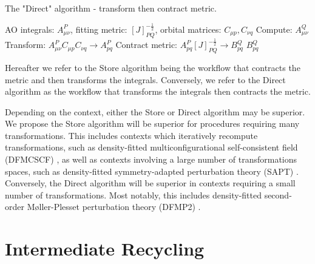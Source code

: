 \begin{algorithm}[H]
\caption{The "Direct" algorithm - transform then contract metric.}
\begin{algorithmic}
\REQUIRE AO integrals: $A_{\mu \nu}^P$, fitting metric: $[J]_{PQ}^{-\frac{1}{2}}$, orbital matrices: $C_{\mu p}, C_{\nu q}$
\STATE Compute: $A_{\mu \nu}^Q$
    \STATE Transform: $A_{\mu \nu}^PC_{\mu p}C_{\nu q} \rightarrow A_{p q}^P$
    \STATE Contract metric: $A_{p q}^P [J]_{PQ}^{-\frac{1}{2}} \rightarrow B_{p q}^Q$
\ENDFOR
\RETURN $B_{p q}^Q$
\end{algorithmic}
\end{algorithm}

\noindent Hereafter we refer to the Store algorithm being the workflow that contracts the metric and then transforms the integrals. Conversely, 
we refer to the Direct algorithm as the workflow that transforms the integrals then contracts the metric. 

Depending on the context, either the Store or Direct algorithm may be superior. We propose the Store algorithm 
will be superior for procedures requiring
many transformations. This includes contexts which iteratively recompute transformations, such as density-fitted 
multiconfigurational self-consistent field (DFMCSCF) \cite{Hohenstein:2015:224103}, 
as well as contexts 
involving a large number of transformations spaces, such as density-fitted symmetry-adapted perturbation theory (SAPT) \cite{ref6, ref7}. 
Conversely, the Direct algorithm will be superior in contexts requiring a small number of transformations. Most notably, 
this includes density-fitted second-order M{\o}ller-Plesset perturbation theory (DFMP2) \cite{ref4}.

%

\section{Intermediate Recycling}

